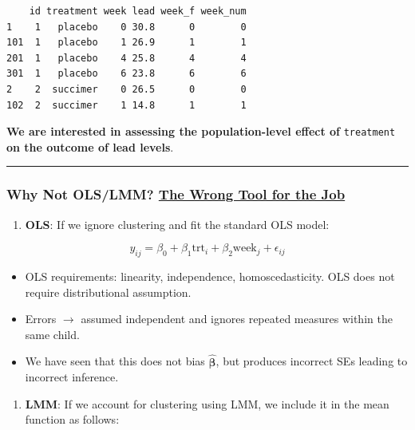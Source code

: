 \documentclass[
  letterpaper,
  DIV=11,
  numbers=noendperiod]{scrreprt}
\providecommand{\tightlist}{%
  \setlength{\itemsep}{0pt}\setlength{\parskip}{0pt}}\usepackage{longtable,booktabs,array}
\begin{document}
\begin{verbatim}
    id treatment week lead week_f week_num
1    1   placebo    0 30.8      0        0
101  1   placebo    1 26.9      1        1
201  1   placebo    4 25.8      4        4
301  1   placebo    6 23.8      6        6
2    2  succimer    0 26.5      0        0
102  2  succimer    1 14.8      1        1
\end{verbatim}

\textbf{We are interested in assessing the population-level effect of}
\texttt{treatment} \textbf{on the outcome of lead levels}.

\begin{center}\rule{0.5\linewidth}{0.5pt}\end{center}

\hypertarget{why-not-olslmm-the-wrong-tool-for-the-job}{%
\subsubsection*{\texorpdfstring{Why Not OLS/LMM? \ul{The Wrong Tool for
the
Job}}{Why Not OLS/LMM? The Wrong Tool for the Job}}\label{why-not-olslmm-the-wrong-tool-for-the-job}}

\begin{enumerate}
\def\labelenumi{(\arabic{enumi})}
\tightlist
\item
  \textbf{OLS}: If we ignore clustering and fit the standard OLS model:
\end{enumerate}

\[
y_{ij} = \beta_0 + \beta_1 \text{trt}_i + \beta_2 \text{week}_j + \epsilon_{ij}
\]

\begin{itemize}
\tightlist
\item
  OLS requirements: linearity, independence, homoscedasticity. OLS does
  not require distributional assumption.
\item
  Errors \(\rightarrow\) assumed independent and ignores repeated
  measures within the same child.
\item
  We have seen that this does not bias \(\mathbf{\hat{\beta}}\), but
  produces incorrect SEs leading to incorrect inference.
\end{itemize}

\begin{enumerate}
\def\labelenumi{(\arabic{enumi})}
\setcounter{enumi}{1}
\tightlist
\item
  \textbf{LMM}: If we account for clustering using LMM, we include it in
  the mean function as follows:
\end{enumerate}
\end{document}
